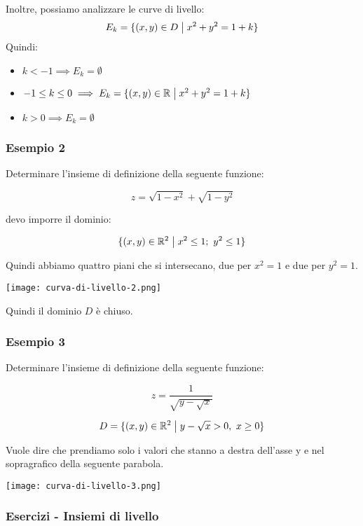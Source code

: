 Inoltre, possiamo analizzare le curve di livello:
\[
    E_k = \{(x,y) \in D \;\big|\; x^2+y^2=1+k\}
\]
Quindi:
\begin{itemize}
    \item \(k<-1 \implies E_k = \emptyset \)
    \item \(-1\le k \le 0 \implies E_k = \{(x,y)\in \mathbb{R} \;\big|\; x^2+y^2=1+k\} \)
    \item \(k>0 \implies E_k = \emptyset \)
\end{itemize}

\filbreak{}
\subsubsection*{Esempio 2}

Determinare l'insieme di definizione della seguente funzione:

\[
    z = \sqrt{1-x^{2}}+\sqrt{1-y^{2}}
\]

devo imporre il dominio:

\[
    \{(x,y) \in \mathbb{R}^{2} \;\big|\; x^{2}\le 1;\ y^{2}\le 1\}
\]

Quindi abbiamo quattro piani che si intersecano, due per \(x^2=1\) e due per \(y^2=1\).

\begin{center}
    \texttt{[image: curva-di-livello-2.png]}
\end{center}

Quindi il dominio \(D\) è chiuso.

\pagebreak
\subsubsection*{Esempio 3}

Determinare l'insieme di definizione della seguente funzione:

\[
    z = \frac{1}{\sqrt{y-\sqrt{x}}}
\]

\[
    D=\{(x,y) \in \mathbb{R}^{2} \;\big|\; y-\sqrt{x}>0,\ x \ge 0\}
\]

Vuole dire che prendiamo solo i valori che stanno a destra dell'asse y e nel sopragrafico della seguente parabola.

\begin{center}
    \texttt{[image: curva-di-livello-3.png]}
\end{center}

\pagebreak
\subsubsection{Esercizi {-} Insiemi di livello}

